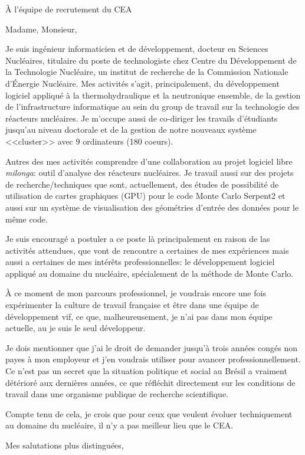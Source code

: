 \documentclass[11pt]{letter}
\begin{document}
\begin{letter}{À l'équipe de recrutement du CEA}

  \opening{Madame, Monsieur,}

  Je suis ingénieur informaticien et de développement, docteur en Sciences Nucléaires, titulaire du poste de technologiste chez Centre du Développement de la Technologie Nucléaire, un institut de recherche de la Commission Nationale d'Énergie Nucléaire. Mes activités s'agit, principalement, du développement logiciel appliqué à la thermohydraulique et la neutronique
  ensemble, de la gestion de l'infrastructure informatique au sein du group de travail sur la technologie des réacteurs
  nucléaires. Je m'occupe aussi de co-diriger les travails d'étudiants jusqu'au niveau
  doctorale et de la gestion de notre nouveaux système <<cluster>> avec 9 ordinateurs (180 coeurs).

  Autres des mes activités comprendre d'une collaboration au projet logiciel libre \textit{milonga}: outil d'analyse
  des réacteurs nucléaires. Je travail aussi sur des projets de recherche/techniques que sont, actuellement, des
  études de possibilité de utilisation de cartes graphiques (GPU) pour le code Monte Carlo Serpent2 et aussi sur un système
  de visualisation des géométries d'entrée des données pour le même code.

  Je suis encouragé a postuler a ce poste là principalement en raison de las activités attendues, que vont de
  rencontre a certaines de mes expériences mais aussi a certaines de mes intérêts professionnelles: le développement
  logiciel appliqué au domaine du nucléaire, spécialement de la méthode de Monte Carlo.

  À ce moment de mon parcours professionnel, je voudrais encore une fois expérimenter la culture de travail française
  et être dans une équipe de développement vif, ce que, malheureusement, je n'ai pas dans mon équipe actuelle, au je
  suis le seul développeur.

  Je dois mentionner que j'ai le droit de demander jusqu'à trois années congés non payes à mon employeur et j'en voudrais
  utiliser pour avancer professionnellement. Ce n'est pas un secret que la situation politique et social au Brésil a
  vraiment détérioré aux dernières années, ce que réfléchit directement sur les conditions de travail dans une organisme
  publique de recherche scientifique.


  Compte tenu de cela, je crois que pour ceux que veulent évoluer techniquement au domaine du nucléaire, il n'y
  a pas meilleur lieu que le CEA.
  
  
  \closing{Mes salutations plus distinguées,}

  
\end{letter}
\end{document}
